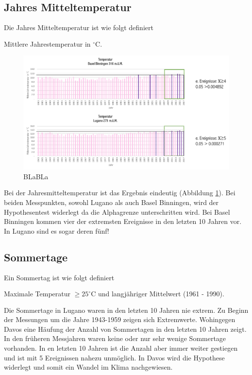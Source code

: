 \begin{refsection}
\subsection{Jahres Mitteltemperatur}
Die Jahres Mitteltemperatur ist wie folgt definiert

\begin{definition}
Mittlere Jahrestemperatur in $^{\circ}$C.
\end{definition}

\begin{figure}[htbp]
\centering
\includegraphics[width=1.0\textwidth]{extrem/JMittel.pdf}
\caption{BLaBLa}
\label{JMittel}
\end{figure}

Bei der Jahresmitteltemperatur ist das Ergebnis eindeutig (Abbildung \ref{JMittel}). Bei beiden Messpunkten, sowohl Lugano als auch Basel Binningen, wird der Hypothesentest widerlegt da die Alphagrenze unterschritten wird. Bei Basel Binningen kommen vier der extremsten Ereignisse in den letzten 10 Jahren vor. In Lugano sind es sogar deren fünf! 


\subsection{Sommertage}
Ein Sommertag ist wie folgt definiert

\begin{definition}
Maximale Temperatur $\ge 25^{\circ}$C und langjähriger Mittelwert (1961 - 1990).
\end{definition}


Die Sommertage in Lugano waren in den letzten 10 Jahren nie extrem. Zu Beginn der Messungen um die Jahre 1943-1959 zeigen sich Extremwerte. Wohingegen Davos eine Häufung der Anzahl von Sommertagen in den letzten 10 Jahren zeigt. In den früheren Messjahren waren keine oder nur sehr wenige Sommertage vorhanden. In en letzten 10 Jahren ist die Anzahl aber immer weiter gestiegen und ist mit 5 Ereignissen nahezu unmöglich. In Davos wird die Hypothese widerlegt und somit ein Wandel im Klima nachgewiesen.


\end{refsection}
